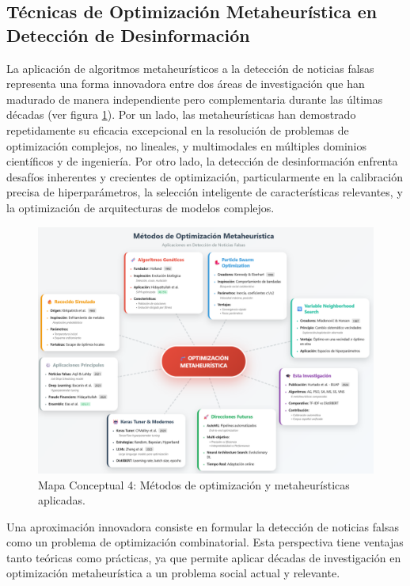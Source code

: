 \subsection{Técnicas de Optimización Metaheurística en Detección de Desinformación}

La aplicación de algoritmos metaheurísticos a la detección de noticias falsas representa una forma innovadora entre dos áreas de investigación que han madurado de manera independiente pero complementaria durante las últimas décadas (ver figura \ref{fig:mapa_conceptual_4}). Por un lado, las metaheurísticas han demostrado repetidamente su eficacia excepcional en la resolución de problemas de optimización complejos, no lineales, y multimodales en múltiples dominios científicos y de ingeniería. Por otro lado, la detección de desinformación enfrenta desafíos inherentes y crecientes de optimización, particularmente en la calibración precisa de hiperparámetros, la selección inteligente de características relevantes, y la optimización de arquitecturas de modelos complejos.

\begin{figure}[h!]
    \centering
    \includegraphics[width=\textwidth]{Imagenes/mapaConceptual4.png}
    \caption{Mapa Conceptual 4: Métodos de optimización y metaheurísticas aplicadas.}
    \label{fig:mapa_conceptual_4}
\end{figure}

Una aproximación innovadora consiste en formular la detección de noticias falsas como un problema de optimización combinatorial. Esta perspectiva tiene ventajas tanto teóricas como prácticas, ya que permite aplicar décadas de investigación en optimización metaheurística a un problema social actual y relevante. 

